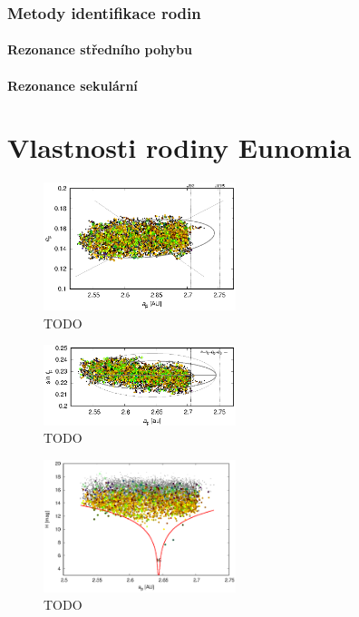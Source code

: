 \documentclass[A4paper, 12pt, oneside]{book}
\begin{document}
\subsection{Metody identifikace rodin}
\subsubsection{Rezonance středního pohybu}
\subsubsection{Rezonance sekulární}

\chapter{Vlastnosti rodiny Eunomia}
\begin{figure}
	\centering
	\includegraphics[width=0.5\textwidth]{obr/ae_wise}
	\caption{TODO}
	\label{ae_wise}
\end{figure}
\begin{figure}
	\centering
	\includegraphics[width=0.5\textwidth]{obr/ai_wise}
	\caption{TODO}
	\label{ai_wise}
\end{figure}
\begin{figure}
	\centering
	\includegraphics[width=0.5\textwidth]{obr/aH_wise}
	\caption{TODO}
	\label{aH_wise}
\end{figure}
\end{document}
